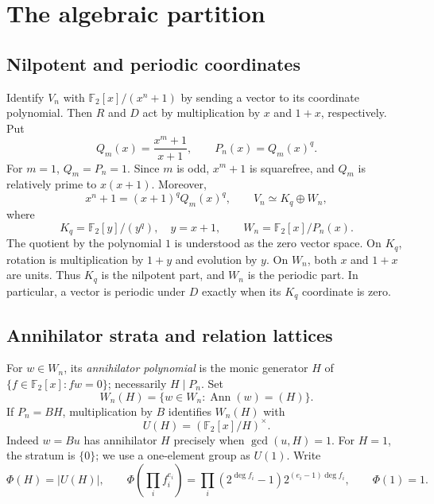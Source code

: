 \documentclass[11pt]{article}
\theoremstyle{definition}
\theoremstyle{remark}
\numberwithin{equation}{section}
\newcommand{\F}{\mathbb F_2}
\newcommand{\phip}{\Phi}
\DeclareMathOperator{\Ann}{Ann}
\begin{document}
\section{The algebraic partition}\label{sec:partition}

\subsection{Nilpotent and periodic coordinates}

Identify $V_n$ with $\F[x]/(x^n+1)$ by sending a vector to its coordinate
polynomial. Then $R$ and $D$ act by multiplication by $x$ and $1+x$,
respectively. Put
\begin{equation}\label{eq:qm}
 Q_m(x)=\frac{x^m+1}{x+1},\qquad P_n(x)=Q_m(x)^q.
\end{equation}
For $m=1$, $Q_m=P_n=1$. Since $m$ is odd, $x^m+1$ is squarefree, and
$Q_m$ is relatively prime to $x(x+1)$. Moreover,
\begin{equation}\label{eq:crt}
 x^n+1=(x+1)^q Q_m(x)^q,\qquad
 V_n\simeq K_q\oplus W_n,
\end{equation}
where
\[
 K_q=\F[y]/(y^q),\quad y=x+1,
 \qquad W_n=\F[x]/P_n(x).
\]
The quotient by the polynomial $1$ is understood as the zero vector space.
On $K_q$, rotation is multiplication by $1+y$ and evolution by $y$.
On $W_n$, both $x$ and $1+x$ are units. Thus $K_q$ is the nilpotent part,
and $W_n$ is the periodic part. In particular, a vector is periodic under
$D$ exactly when its $K_q$ coordinate is zero.

\subsection{Annihilator strata and relation lattices}

For $w\in W_n$, its \emph{annihilator polynomial} is the monic generator
$H$ of $\{f\in\F[x]:fw=0\}$; necessarily $H\mid P_n$. Set
\[
 W_n(H)=\{w\in W_n:\Ann(w)=(H)\}.
\]
If $P_n=BH$, multiplication by $B$ identifies $W_n(H)$ with
\begin{equation}\label{eq:unit-stratum}
 U(H)=(\F[x]/H)^\times.
\end{equation}
Indeed $w=Bu$ has annihilator $H$ precisely when $\gcd(u,H)=1$.
For $H=1$, the stratum is $\{0\}$; we use a one-element group as $U(1)$.
Write
\begin{equation}\label{eq:phi-polynomial}
 \phip(H)=|U(H)|,
 \qquad
 \phip\left(\prod_i f_i^{e_i}\right)
 =\prod_i (2^{\deg f_i}-1)2^{(e_i-1)\deg f_i},
 \qquad \phip(1)=1.
\end{equation}
\end{document}
